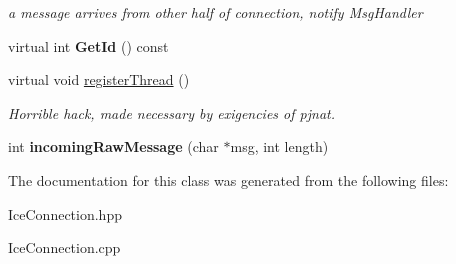 \begin{DoxyCompactItemize}
\begin{DoxyCompactList}\small\item\em a message arrives from other half of connection, notify MsgHandler \item\end{DoxyCompactList}\item 
\hypertarget{classIceConnection_a9f105aee4fe5d2079021c0e076a8f8bc}{
virtual int {\bfseries GetId} () const }
\label{classIceConnection_a9f105aee4fe5d2079021c0e076a8f8bc}

\item 
\hypertarget{classIceConnection_a7397be107c4a18c0fe288ce59e99991a}{
virtual void \hyperlink{classIceConnection_a7397be107c4a18c0fe288ce59e99991a}{registerThread} ()}
\label{classIceConnection_a7397be107c4a18c0fe288ce59e99991a}

\begin{DoxyCompactList}\small\item\em Horrible hack, made necessary by exigencies of pjnat. \item\end{DoxyCompactList}\item 
\hypertarget{classIceConnection_ab8d85a088dce0a5637db693c2d7aeb6d}{
int {\bfseries incomingRawMessage} (char $\ast$msg, int length)}
\label{classIceConnection_ab8d85a088dce0a5637db693c2d7aeb6d}

\end{DoxyCompactItemize}


The documentation for this class was generated from the following files:\begin{DoxyCompactItemize}
\item 
IceConnection.hpp\item 
IceConnection.cpp\end{DoxyCompactItemize}
